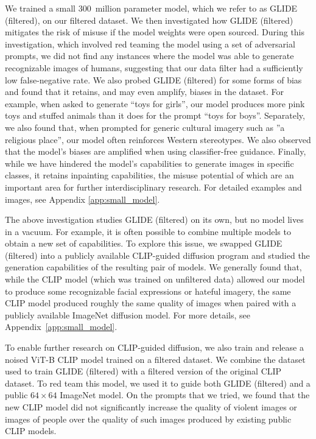 \documentclass{article}
\newcommand{\modelname}{GLIDE}
\begin{document}
We trained a small 300~million parameter model, which we refer to as \modelname{} (filtered), on our filtered dataset. We then investigated how \modelname{} (filtered) mitigates the risk of misuse if the model weights were open sourced. During this investigation, which involved red teaming the model using a set of adversarial prompts, we did not find any instances where the model was able to generate recognizable images of humans, suggesting that our data filter had a sufficiently low false-negative rate. 
We also probed \modelname{} (filtered) for some forms of bias and found that it retains, and may even amplify, biases in the dataset. For example, when asked to generate ``toys for girls'', our model produces more pink toys and stuffed animals than it does for the prompt ``toys for boys''. Separately, we also found that, when prompted for generic cultural imagery such as ''a religious place'', our model often reinforces Western stereotypes. We also observed that the model's biases are amplified when using classifier-free guidance. Finally, while we have hindered the model's capabilities to generate images in specific classes, it retains inpainting capabilities,  the misuse potential of which are an important area for further interdisciplinary research. For detailed examples and images, see Appendix \ref{app:small_model}.

The above investigation studies \modelname{} (filtered) on its own, but no model lives in a vacuum. For example, it is often possible to combine multiple models to obtain a new set of capabilities. To explore this issue, we swapped \modelname{} (filtered) into a publicly available CLIP-guided diffusion program \citep{clipdiff} and studied the generation capabilities of the resulting pair of models. We generally found that, while the CLIP model (which was trained on unfiltered data) allowed our model to produce some recognizable facial expressions or hateful imagery, the same CLIP model produced roughly the same quality of images when paired with a publicly available ImageNet diffusion model. For more details, see Appendix~\ref{app:small_model}.

To enable further research on CLIP-guided diffusion, we also train and release a noised ViT-B CLIP model trained on a filtered dataset. We combine the dataset used to train \modelname{} (filtered) with a filtered version of the original CLIP dataset. To red team this model, we used it to guide both \modelname{} (filtered) and a public $64 \times 64$ ImageNet model. On the prompts that we tried, we found that the new CLIP model did not significantly increase the quality of violent images or images of people over the quality of such images produced by existing public CLIP models.
\end{document}
